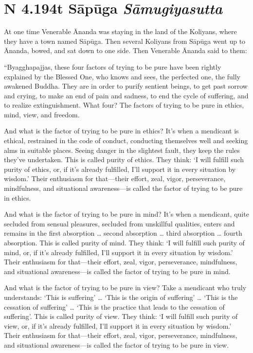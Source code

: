 \documentclass[12pt,openany]{book}%
\newcommand*{\suttatitleacronym}[1]{\smaller[2]{#1}\vspace*{.3em}}
\newcommand*{\suttatitletranslation}[1]{\linebreak{#1}}
\newcommand*{\suttatitleroot}[1]{\linebreak\smaller[2]\itshape{#1}}
\newcommand*{\tocacronym}[1]{\hspace*{-3.3em}{#1}\quad}
\newcommand*{\toctranslation}[1]{#1}
\newcommand*{\tocroot}[1]{(\textit{#1})}
\begin{document}
%
\section*{{\suttatitleacronym AN 4.194}{\suttatitletranslation At Sāpūga }{\suttatitleroot Sāmugiyasutta}}
\addcontentsline{toc}{section}{\tocacronym{AN 4.194} \toctranslation{At Sāpūga } \tocroot{Sāmugiyasutta}}

At one time Venerable Ānanda was staying in the land of the Koliyans, where they have a town named \textsanskrit{Sāpūga}. Then several Koliyans from \textsanskrit{Sāpūga} went up to Ānanda, bowed, and sat down to one side. Then Venerable Ānanda said to them: 

“Byagghapajjas, these four factors of trying to be pure have been rightly explained by the Blessed One, who knows and sees, the perfected one, the fully awakened Buddha. They are in order to purify sentient beings, to get past sorrow and crying, to make an end of pain and sadness, to end the cycle of suffering, and to realize extinguishment. What four? The factors of trying to be pure in ethics, mind, view, and freedom. 

And what is the factor of trying to be pure in ethics? It’s when a mendicant is ethical, restrained in the code of conduct, conducting themselves well and seeking alms in suitable places. Seeing danger in the slightest fault, they keep the rules they’ve undertaken. This is called purity of ethics. They think: ‘I will fulfill such purity of ethics, or, if it’s already fulfilled, I’ll support it in every situation by wisdom.’ Their enthusiasm for that—their effort, zeal, vigor, perseverance, mindfulness, and situational awareness—is called the factor of trying to be pure in ethics. 

And what is the factor of trying to be pure in mind? It’s when a mendicant, quite secluded from sensual pleasures, secluded from unskillful qualities, enters and remains in the first absorption … second absorption … third absorption … fourth absorption. This is called purity of mind. They think: ‘I will fulfill such purity of mind, or, if it’s already fulfilled, I’ll support it in every situation by wisdom.’ Their enthusiasm for that—their effort, zeal, vigor, perseverance, mindfulness, and situational awareness—is called the factor of trying to be pure in mind. 

And what is the factor of trying to be pure in view? Take a mendicant who truly understands: ‘This is suffering’ … ‘This is the origin of suffering’ … ‘This is the cessation of suffering’ … ‘This is the practice that leads to the cessation of suffering’. This is called purity of view. They think: ‘I will fulfill such purity of view, or, if it’s already fulfilled, I’ll support it in every situation by wisdom.’ Their enthusiasm for that—their effort, zeal, vigor, perseverance, mindfulness, and situational awareness—is called the factor of trying to be pure in view. 
\end{document}
